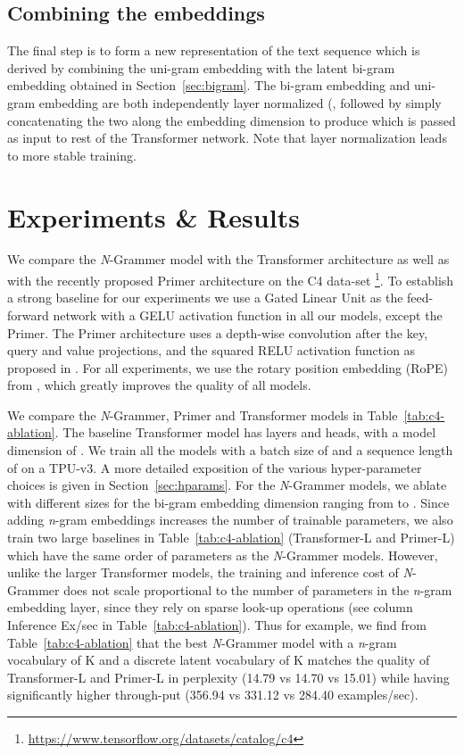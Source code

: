 \documentclass[11pt]{article}
\begin{document}
\subsection{Combining the embeddings}\label{sec:combining}
The final step is to form a new representation of the text sequence which is derived by combining the uni-gram embedding 
with the latent bi-gram embedding 
obtained in Section~\ref{sec:bigram}. The bi-gram embedding and uni-gram embedding are both independently layer normalized (, followed by simply concatenating the two along the embedding dimension to produce
 which is passed as input to rest of the Transformer network. 
Note that layer normalization \citep{ba2016layer} leads to more stable training. 

\section{Experiments \& Results}
We compare the \textit{N}-Grammer model with the Transformer architecture \citep{vaswani2017attention} 
as well as with the recently proposed Primer architecture \citep{so2021primer} on the C4 data-set
\citep{raffel2019exploring}
\footnote{\url{https://www.tensorflow.org/datasets/catalog/c4}}. To establish a strong baseline for our experiments we use a Gated Linear Unit
\citep{dauphin2017language} as the feed-forward network with a GELU activation function 
\citep{hendrycks2016gaussian} in all our models, except the Primer. The Primer architecture 
uses a  depth-wise convolution after the key,
query and value projections, and the squared RELU 
activation function as proposed in 
\citet{so2021primer}. For all experiments, we use the rotary position embedding (RoPE) from \citet{su2021roformer},
which greatly improves the quality of all models. 

We compare the \textit{N}-Grammer, Primer and Transformer models in Table~\ref{tab:c4-ablation}. The baseline Transformer model has  layers and  heads, with a model dimension of . We train all the models
with a batch size of  and a sequence length of  on a TPU-v3. A more detailed exposition of the various
hyper-parameter choices is given in Section~\ref{sec:hparams}.
For the \textit{N}-Grammer models, we ablate 
with different sizes for the bi-gram embedding dimension ranging from 
to . Since adding \textit{n}-gram embeddings increases 
the number of trainable parameters, we also train two large 
baselines in Table~\ref{tab:c4-ablation} (Transformer-L  and 
Primer-L) which have the same order of parameters as the 
\textit{N}-Grammer models. However, unlike the larger 
Transformer models, the training and inference cost of 
\textit{N}-Grammer does not scale 
proportional to the number of parameters in the
\textit{n}-gram embedding layer, 
since they rely on sparse look-up operations 
(see column Inference Ex/sec in 
Table~\ref{tab:c4-ablation}). Thus for example, we find from 
Table~\ref{tab:c4-ablation} that the best \textit{N}-Grammer
model with a \textit{n}-gram vocabulary of K and a discrete
latent vocabulary of K matches the quality of Transformer-L
and Primer-L in perplexity (14.79 vs 14.70 vs 15.01) while having
significantly higher through-put (356.94 vs 331.12 vs 284.40 
examples/sec).
\end{document}
